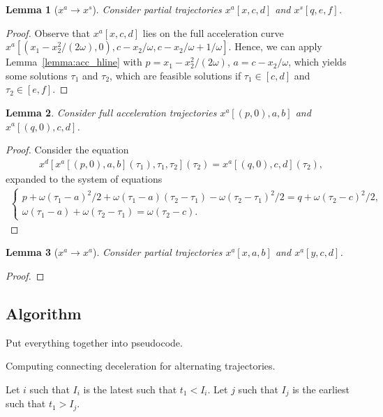 \documentclass[a4paper]{report}
\theoremstyle{definition}
\theoremstyle{plain}
\newtheorem{lemma}{Lemma}[chapter]
\begin{document}
\begin{lemma}[$x^{a} \rightarrow x^{s}$]
  Consider partial trajectories $x^{a}[x, c, d]$ and $x^{s}[q, e, f]$.
\end{lemma}
\begin{proof}
  Observe that $x^{a}[x, c, d]$ lies on the full acceleration curve
  $x^{a}[(x_{1} - x_{2}^{2}/(2\omega), 0), c - x_{2}/\omega, c - x_{2}/\omega + 1/\omega]$.
  Hence, we can apply Lemma~\ref{lemma:acc_hline} with
  $p=x_{1} - x_{2}^{2}/(2 \omega)$, $a = c - x_{2}/\omega$, which yields some
  solutions $\tau_{1}$ and $\tau_{2}$, which are feasible solutions if
  $\tau_{1} \in [c, d]$ and $\tau_{2} \in [e, f]$.
\end{proof}

\begin{lemma}
  Consider full acceleration trajectories $x^{a}[(p, 0), a, b]$ and
  $x^{a}[(q, 0), c, d]$.
\end{lemma}
\begin{proof}
  Consider the equation
  \begin{align*}
    x^{d}[x^{a}[(p, 0), a, b](\tau_{1}), \tau_{1}, \tau_{2}](\tau_{2}) = x^{a}[(q, 0), c, d](\tau_{2}) ,
  \end{align*}
  expanded to the system of equations
  \begin{align*}
    \begin{cases}
      p + \omega(\tau_{1} - a)^{2}/2 + \omega(\tau_{1} - a)(\tau_{2} - \tau_{1}) - \omega(\tau_{2} - \tau_{1})^{2}/2 = q + \omega(\tau_{2} - c)^{2}/2 , \\
      \omega(\tau_{1} - a) + \omega(\tau_{2} - \tau_{1}) = \omega(\tau_{2} - c) .
    \end{cases}
  \end{align*}
\end{proof}

\begin{lemma}[$x^{a} \rightarrow x^{a}$]
  Consider partial trajectories $x^{a}[x, a, b]$ and $x^{a}[y, c, d]$.
\end{lemma}
\begin{proof}

\end{proof}

\subsection{Algorithm}

Put everything together into pseudocode.

\begin{algorithm}
  \caption{Computing connecting deceleration for alternating trajectories.}
    \label{alg:connecting}
    \begin{algorithmic}
      \State Let $i$ such that $I_{i}$ is the latest such that $t_{1} < I_{i}$.
      \State Let $j$ such that $I_{j}$ is the earliest such that $t_{1} > I_{j}$.
    \end{algorithmic}
\end{algorithm}
\end{document}
